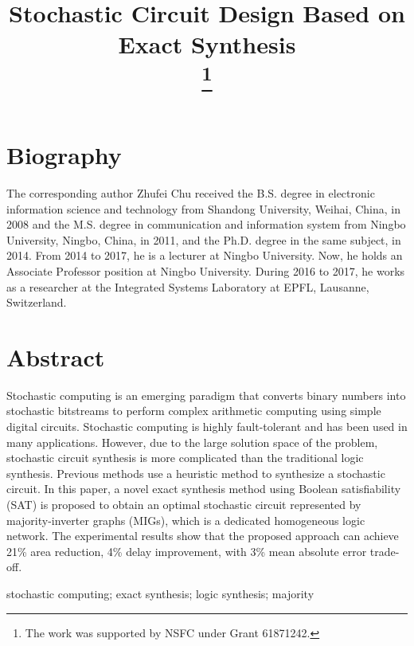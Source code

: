 \documentclass[conference,letterpaper]{IEEEtran}
\begin{document}
\title{Stochastic Circuit Design Based on Exact Synthesis\\
\thanks{The work was supported by NSFC under Grant 61871242.}
}

\author{
}

\maketitle

\section*{\textbf{Biography}}
The corresponding author Zhufei Chu received the B.S. degree in electronic information science and technology from Shandong University, Weihai, China, in 2008 and the M.S. degree in communication and information system from Ningbo University, Ningbo, China, in 2011, and the Ph.D. degree in the same subject, in 2014. From 2014 to 2017, he is a lecturer at Ningbo University. Now, he holds an Associate Professor position at Ningbo University. During 2016 to 2017, he works as a researcher at the Integrated Systems Laboratory at EPFL, Lausanne, Switzerland.

\section*{\textbf{Abstract}}
Stochastic computing is an emerging paradigm that converts binary numbers into stochastic bitstreams to perform complex arithmetic computing using simple digital circuits. 
Stochastic computing is highly fault-tolerant and has been used in many applications. 
However, due to the large solution space of the problem, stochastic circuit synthesis is more complicated than the traditional logic synthesis.
Previous methods use a heuristic method to synthesize a stochastic circuit. In this paper, a novel exact synthesis method using Boolean satisfiability (SAT) is proposed to obtain an optimal stochastic circuit represented by majority-inverter graphs (MIGs), which is a dedicated homogeneous logic network. The experimental results show that the proposed approach can achieve 21\% area reduction, 4\% delay improvement, with 3\% mean absolute error trade-off.  
\vspace{2ex}

\begin{IEEEkeywords}
stochastic computing; exact synthesis; logic synthesis; majority
\end{IEEEkeywords}
\end{document}
